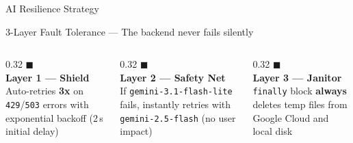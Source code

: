 \documentclass[aspectratio=169]{beamer}
\newcommand{\hl}[1]{\textcolor{accentlight}{\textbf{#1}}}
\begin{document}
\begin{frame}{AI Resilience Strategy}
  \begin{block}{3-Layer Fault Tolerance --- The backend never fails silently}
  \end{block}
  \vspace{0.5cm}
  \begin{columns}[T]
    \begin{column}{0.32\textwidth}
      \centering
      \textcolor{accent}{\Large $\blacksquare$}\\[0.2cm]
      \hl{Layer 1 --- Shield}\\[0.2cm]
      \small Auto-retries \textbf{3x} on \texttt{429}/\texttt{503} errors with exponential backoff (2\,s initial delay)
    \end{column}
    \begin{column}{0.32\textwidth}
      \centering
      \textcolor{accentlight}{\Large $\blacksquare$}\\[0.2cm]
      \hl{Layer 2 --- Safety Net}\\[0.2cm]
      \small If \texttt{gemini-3.1-flash-lite} fails, instantly retries with \texttt{gemini-2.5-flash} (no user impact)
    \end{column}
    \begin{column}{0.32\textwidth}
      \centering
      \textcolor{successgreen}{\Large $\blacksquare$}\\[0.2cm]
      \hl{Layer 3 --- Janitor}\\[0.2cm]
      \small \texttt{finally} block \textbf{always} deletes temp files from Google Cloud and local disk
    \end{column}
  \end{columns}
\end{frame}
\end{document}
